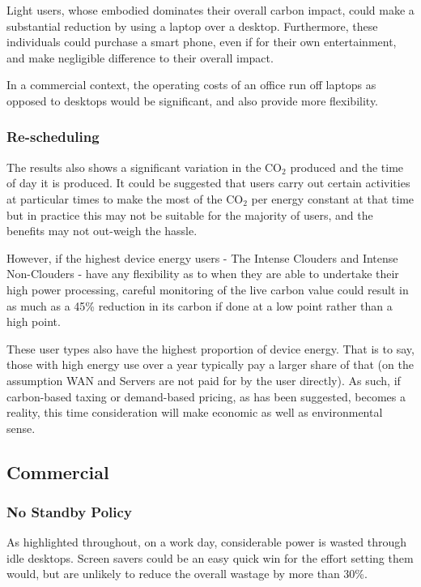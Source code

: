 \documentclass[conference]{IEEEtran}
\begin{document}
Light users, whose embodied dominates their overall carbon impact,
could make a substantial reduction by using a laptop over a
desktop. Furthermore, these individuals could purchase a smart phone,
even if for their own entertainment, and make negligible difference to
their overall impact.

In a commercial context, the operating costs of an office run off
laptops as opposed to desktops would be significant, and also provide
more flexibility.

\subsubsection{Re-scheduling}

The results also shows a significant variation in the CO$_2$ produced and
the time of day it is produced. It could be suggested that users carry
out certain activities at particular times to make the most of the CO$_2$
per energy constant at that time but in practice this may not be
suitable for the majority of users, and the benefits may not out-weigh
the hassle.

However, if the highest device energy users - The Intense Clouders and
Intense Non-Clouders - have any flexibility as to when they are able
to undertake their high power processing, careful monitoring of the
live carbon value could result in as much as a 45\% reduction in its
carbon if done at a low point rather than a high point.

These user types also have the highest proportion of device
energy. That is to say, those with high energy use over a year
typically pay a larger share of that (on the assumption WAN and
Servers are not paid for by the user directly). As such, if
carbon-based taxing or demand-based pricing, as has been suggested,
becomes a reality, this time consideration will make economic as well
as environmental sense.

\subsection{Commercial}

\subsubsection{No Standby Policy}

As highlighted throughout, on a work day, considerable power is wasted
through idle desktops. Screen savers could be an easy quick win for
the effort setting them would, but are unlikely to reduce the overall
wastage by more than 30\%.
\end{document}

